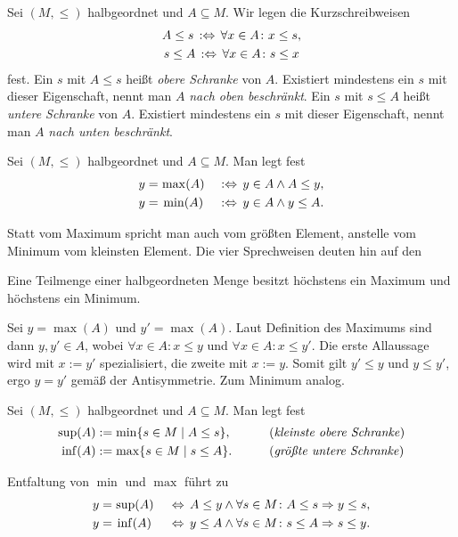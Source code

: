 \noindent
Sei $(M,\le)$ halbgeordnet und $A\subseteq M$. Wir legen die
Kurzschreibweisen
\begin{gather*}
A\le s\, :\Leftrightarrow\, \forall x\in A\colon x\le s,\\
s\le A\, :\Leftrightarrow\, \forall x\in A\colon s\le x
\end{gather*}
fest. Ein $s$ mit $A\le s$ heißt \emph{obere Schranke} von $A$. Existiert
mindestens ein $s$ mit dieser Eigenschaft, nennt man $A$ \emph{nach oben
beschränkt}. Ein $s$ mit $s\le A$ heißt \emph{untere Schranke} von $A$.
Existiert mindestens ein $s$ mit dieser Eigenschaft, nennt man $A$
\emph{nach unten beschränkt}.

\begin{Definition}\label{def:max-min}%
\newlinefirst
Sei $(M,\le)$ halbgeordnet und $A\subseteq M$. Man legt fest
\begin{alignat*}{3}
y = &\hspace{1.4pt}\max(A)\,\,&:\Leftrightarrow\, y\in A\land A\le y,\\
y = &\hspace{2.4pt}\min(A)\,\,&:\Leftrightarrow\, y\in A\land y\le A.
\end{alignat*}
\end{Definition}

\noindent
Statt vom Maximum spricht man auch vom größten Element,
anstelle vom Minimum vom kleinsten Element. Die vier Sprechweisen
deuten hin auf den

\begin{Satz}
Eine Teilmenge einer halbgeordneten Menge besitzt höchstens ein Maximum
und höchstens ein Minimum.
\end{Satz}
\begin{Beweis}
Sei $y=\max(A)$ und $y'=\max(A)$. Laut Definition des
Maximums sind dann $y,y'\in A$, wobei $\forall x\in A\colon x\le y$
und $\forall x\in A\colon x\le y'$. Die erste Allaussage wird
mit $x:=y'$ spezialisiert, die zweite mit $x:=y$. Somit
gilt $y'\le y$ und $y\le y'$, ergo $y=y'$ gemäß der Antisymmetrie.
Zum Minimum analog.\,\qedsymbol
\end{Beweis}

\begin{Definition}%
\newlinefirst
Sei $(M,\le)$ halbgeordnet und $A\subseteq M$. Man legt fest
\begin{alignat*}{2}
\sup(A) &:= \min\{s\in M\mid A\le s\},&&\qquad\text{(\emph{kleinste obere Schranke})}\\
\inf(A) &:= \max\{s\in M\mid s\le A\}.&&\qquad\text{(\emph{größte untere Schranke})}
\end{alignat*}
\end{Definition}
Entfaltung von $\min$ und $\max$ führt zu
\begin{alignat*}{2}
y = &\hspace{1.4pt}\sup(A)\, &&\Leftrightarrow\, A\le y\land\forall s\in M\colon A\le s\Rightarrow y\le s,\\
y = &\hspace{2.4pt}\inf(A)\, &&\Leftrightarrow\, y\le A\land\forall s\in M\colon s\le A\Rightarrow s\le y.
\end{alignat*}

